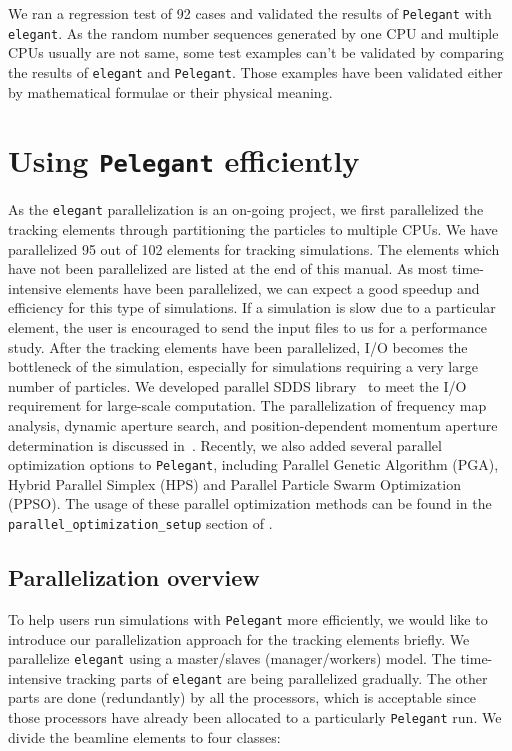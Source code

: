 \documentclass[11pt]{article}
\begin{document}
We ran a regression test of 92 cases and validated the results of {\tt Pelegant} 
with {\tt elegant}. As the random number sequences generated by one CPU 
and multiple CPUs usually are not same, some test examples can't be validated 
by comparing the results of {\tt elegant} and {\tt Pelegant}. Those examples 
have been validated either by mathematical formulae or their physical meaning. 


\section{Using {\tt Pelegant} efficiently}

As the {\tt elegant} parallelization is an on-going project, we first parallelized
the tracking elements through partitioning the particles to multiple CPUs. We have
parallelized 95 out of 102 elements for tracking simulations. The elements
which have not been parallelized are listed at the end of
this manual. As most time-intensive elements have been
parallelized, we can expect a good speedup and efficiency for this type of simulations.
 If a simulation is slow due to a particular element, the user is encouraged to send the input files to us for a performance study. After the tracking elements have been parallelized, I/O becomes the bottleneck of the simulation, especially for simulations requiring a very large number of particles. We developed parallel SDDS library~\cite{PSDDSlib} to meet the I/O requirement for large-scale computation. The parallelization of frequency map analysis, dynamic aperture search, and position-dependent momentum aperture determination is discussed in~\cite{Wang09}.  Recently, we also added several parallel optimization options to {\tt Pelegant}, including Parallel Genetic Algorithm (PGA), Hybrid Parallel Simplex (HPS) and Parallel Particle Swarm Optimization (PPSO). The usage of these parallel optimization methods can be found in the \verb|parallel_optimization_setup| section of .

\subsection{Parallelization overview}

To help users run simulations with {\tt Pelegant} more efficiently, we
would like to introduce our parallelization approach for the tracking elements briefly.  We
parallelize {\tt elegant} using a master/slaves (manager/workers)
model. The time-intensive tracking parts of {\tt elegant} are being
parallelized gradually. The other parts are done (redundantly) by all
the processors, which is acceptable since those processors have
already been allocated to a particularly {\tt Pelegant} run. We divide
the beamline elements to four classes:
\end{document}
